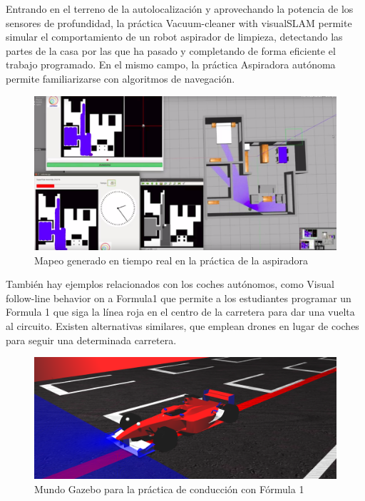 \documentclass[12pt,spanish,chapterprefix, numbers=noenddot]{book}
\numberwithin{equation}{section}
\numberwithin{figure}{section}
\begin{document}
Entrando en el terreno de la autolocalización y aprovechando la potencia de los sensores de profundidad, la práctica Vacuum-cleaner with visualSLAM permite simular el comportamiento de un robot aspirador de limpieza, detectando las partes de la casa por las que ha pasado y completando de forma eficiente el trabajo programado. En el mismo campo, la práctica Aspiradora autónoma \cite{Vanessa} permite familiarizarse con algoritmos de navegación. 

\begin{figure}[hbt!]
\centering
\includegraphics[width=12cm]{Figs/vacuumcleaner.png}
\par
\caption{\label{fig:vacuum}Mapeo generado en tiempo real en la práctica de la aspiradora}
\end{figure}

También hay ejemplos relacionados con los coches autónomos, como Visual follow-line behavior on a Formula1 que permite a los estudiantes programar un Formula 1 que siga la línea roja en el centro de la carretera para dar una vuelta al circuito. Existen alternativas similares, que emplean drones en lugar de coches para seguir una determinada carretera\cite{Pablo}.

\begin{figure}[hbt!]
\centering
\includegraphics[width=12cm]{Figs/f1.png}
\par
\caption{\label{fig:f1}Mundo Gazebo para la práctica de conducción con Fórmula 1}
\end{figure}
\end{document}
